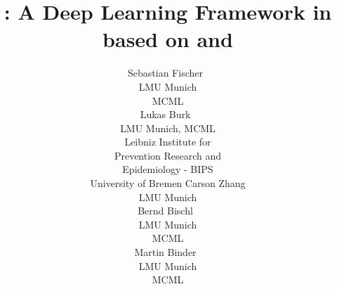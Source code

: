\documentclass[article]{jss}
\author{Sebastian Fischer~\orcidlink{0000-0002-9609-3197} \\
    LMU Munich \\
    MCML \\
    \And Lukas Burk~\orcidlink{0000-0001-7528-3795} \\
    LMU Munich, MCML \\
    Leibniz Institute for\\Prevention Research and\\Epidemiology - BIPS \\
    University of Bremen
    \AND Carson Zhang \\
    LMU Munich \\
    \And Bernd Bischl~\orcidlink{0000-0001-6002-6980} \\
    LMU Munich \\
    MCML \\
    \And Martin Binder~\orcidlink{0009-0008-2578-2869} \\
    LMU Munich \\
    MCML \\
}
\title{\mlrttorch{}: A Deep Learning Framework in \rlang{} based on \mlrt{} and \torch{}}
\theoremstyle{definition}
\begin{document}
\begin{comment}

Done:
\begin{itemize}
  \item [x] Ensure consistent <- over =
  \item [x] max 30 pages (not a strict requirement). We are sightly above this limit, so should be fine
  \item [x] use \top instead of $^T$
  \item [x] For referring to subsections, do not use Subsection x.y, just Section x.y.
  \item [x] All captions should appear below the corresponding figure/table.
  \item [x] Abkürzungen konsistent verwenden: DL, ML, NLP etc.
  \item [x] Use \code{...} instead of \texttt{...} for inline code
  \item [x] Cite all datasets
  \item [x] use proglang everywhere
      * [x] Rust
      * [x] Go
      * [x] Python
      * [x] R
      * [x] C++
      * [x] Julia
  \item [ ] use pkg everywhere
      * [x] " mlr3"
      * [x] " torch "
  \item [x] never use (\cite{...}). (use \citep{} for that)
  \item [x] \title in title style
  \item [x] Do not use additional formatting for specific words unless explicitly required by the JSS style guide, e.g., --> remove emph and textit etc.
  \item [x] No comments in Code, this information should be presented in the normal latex text
  \item [x] In order to use markup in section headers, you can use: \section[Calling C++ from R]{Calling \proglang{C++} from \rlang{}}
  \item [x] To refer to equations, one can use either Equation~\ref{...} (with capitalization) or (\ref{...}) with the former being preferred if the number of equation references is not too large.
  \item [x] The captions should be in sentence style and end with a period. No additional formatting (such as \emph, \bf or \it) should be used for the caption.
  \item [x] All table row/column headers should also be in sentence style. There should not be further footnote-style annotations in tables; these should all be placed in the caption.

\end{comment}
\end{document}
